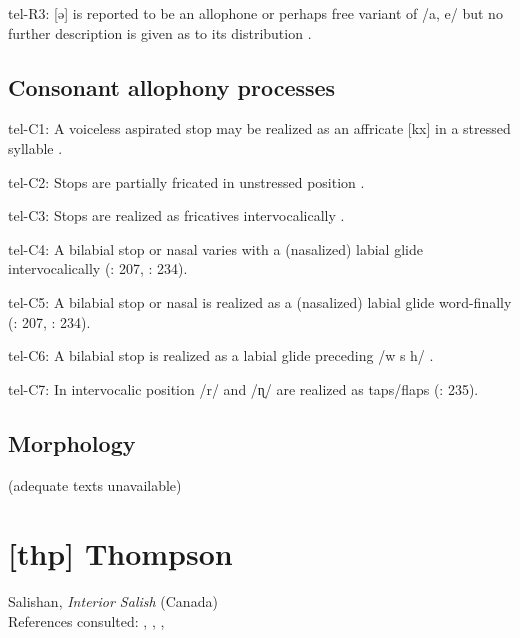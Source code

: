 {\begin{appendixdesc}
\item[tel-R3:] [ə] is reported to be an allophone or perhaps free variant of /a, e/ but no further description is given as to its distribution \citep{KostićEtAl1977}.
\end{appendixdesc}
\subsection*{Consonant allophony processes}
\begin{appendixdesc}

\item[tel-C1:] A voiceless aspirated stop may be realized as an affricate [kx] in a stressed syllable \citep[105]{KostićEtAl1977}.

\item[tel-C2:] Stops are partially fricated in unstressed position \citep[89]{KostićEtAl1977}.

\item[tel-C3:] Stops are realized as fricatives intervocalically \citep[207]{Krishnamurti1998}.

\item[tel-C4:] A bilabial stop or nasal varies with a (nasalized) labial glide intervocalically (\citealt{Krishnamurti1998}: 207, \citealt{BhaskararaoRay2017}: 234).

\item[tel-C5:] A bilabial stop or nasal is realized as a (nasalized) labial glide word-finally (\citealt{Krishnamurti1998}: 207, \citealt{BhaskararaoRay2017}: 234).

\item[tel-C6:] A bilabial stop is realized as a labial glide preceding /w s h/ \citep[207]{Krishnamurti1998}.

\item[tel-C7:] In intervocalic position /r/ and /ɳ/ are realized as taps/flaps (\citealt{BhaskararaoRay2017}: 235).
\end{appendixdesc}
\subsection*{Morphology}

(adequate texts unavailable)

\section*{[thp] Thompson}  %
Salishan, \textit{Interior Salish} (Canada)\medskip\\
References consulted: \citet{Koch2008}, \citet{ThompsonThompson1992}, \citet{ThompsonThompson1996}, \citet{ThompsonEtAl1996}

}
